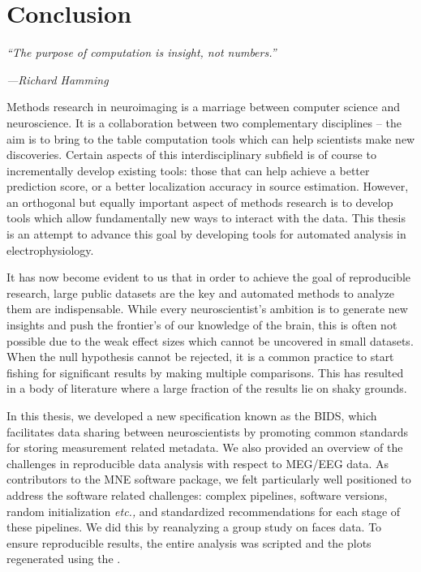 \chapter{Conclusion}
\label{chapter:conclusion}

\epigraph{\small\itshape ``The purpose of computation is insight, not  numbers.''}{\small\textit{---Richard Hamming}}

Methods research in neuroimaging is a marriage between computer science and neuroscience. It is a collaboration between two complementary disciplines -- the aim is to bring to the table computation tools which can help scientists make new discoveries. Certain aspects of this interdisciplinary subfield is of course to incrementally develop existing tools: those that can help achieve a better prediction score, or a better localization accuracy in source estimation. However, an orthogonal but equally important aspect of methods research is to develop tools which allow fundamentally new ways to interact with the data. This thesis is an attempt to advance this goal by developing tools for automated analysis in electrophysiology.

It has now become evident to us that in order to achieve the goal of reproducible research, large public datasets are the key and automated methods to analyze them are indispensable. While every neuroscientist's ambition is to generate new insights and push the frontier's of our knowledge of the brain, this is often not possible due to the weak effect sizes which cannot be uncovered in small datasets. When the null hypothesis cannot be rejected, it is a common practice to start fishing for significant results by making multiple comparisons. This has resulted in a body of literature where a large fraction of the results lie on shaky grounds. 

In this thesis, we developed a new specification known as the \ac{BIDS}, which facilitates data sharing between neuroscientists by promoting common standards for storing measurement related metadata. We also provided an overview of the challenges in reproducible data analysis with respect to \ac{MEG}/\ac{EEG} data. As contributors to the MNE software package, we felt particularly well positioned to address  the software related challenges: complex pipelines, software versions, random initialization \emph{etc.,} and standardized recommendations for each stage of these pipelines. We did this by reanalyzing a group study on faces data. To ensure reproducible results, the entire analysis was scripted and the plots regenerated using the .

